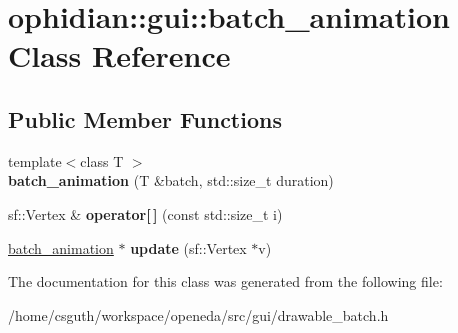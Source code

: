 \hypertarget{classophidian_1_1gui_1_1batch__animation}{\section{ophidian\-:\-:gui\-:\-:batch\-\_\-animation Class Reference}
\label{classophidian_1_1gui_1_1batch__animation}
}
\subsection*{Public Member Functions}
\begin{DoxyCompactItemize}
\item 
\hypertarget{classophidian_1_1gui_1_1batch__animation_a6881843155438bfbeb9ecb77a11d0840}{{\footnotesize template$<$class T $>$ }\\{\bfseries batch\-\_\-animation} (T \&batch, std\-::size\-\_\-t duration)}\label{classophidian_1_1gui_1_1batch__animation_a6881843155438bfbeb9ecb77a11d0840}

\item 
\hypertarget{classophidian_1_1gui_1_1batch__animation_a4466aff67a0cd2d8b760dfaa1dd8095d}{sf\-::\-Vertex \& {\bfseries operator\mbox{[}$\,$\mbox{]}} (const std\-::size\-\_\-t i)}\label{classophidian_1_1gui_1_1batch__animation_a4466aff67a0cd2d8b760dfaa1dd8095d}

\item 
\hypertarget{classophidian_1_1gui_1_1batch__animation_a7b6e0845d1beb2956d1733cea1b90d39}{\hyperlink{classophidian_1_1gui_1_1batch__animation}{batch\-\_\-animation} $\ast$ {\bfseries update} (sf\-::\-Vertex $\ast$v)}\label{classophidian_1_1gui_1_1batch__animation_a7b6e0845d1beb2956d1733cea1b90d39}

\end{DoxyCompactItemize}


The documentation for this class was generated from the following file\-:\begin{DoxyCompactItemize}
\item 
/home/csguth/workspace/openeda/src/gui/drawable\-\_\-batch.\-h\end{DoxyCompactItemize}
